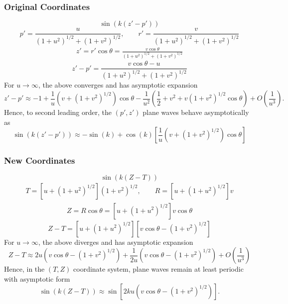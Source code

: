 \documentclass[10pt,letterpaper]{article}
\begin{document}
\subsubsection*{Original Coordinates}
\begin{equation}
\sin(k(z'-p'))
\end{equation}
\begin{equation}
p' = \frac{ u}{(1+u^2)^{1/2}+(1+v^2)^{1/2}},\qquad r' = \frac{v}{(1+u^2)^{1/2}+(1+v^2)^{1/2}}
\end{equation}
\begin{align}
z' = r'\cos\theta = \frac{v\cos\theta}{(1+u^2)^{1/2}+(1+v^2)^{1/2}}
\end{align}
\begin{equation}
z'-p' = \frac{v\cos\theta - u}{(1+u^2)^{1/2}+(1+v^2)^{1/2}}
\end{equation}
For $u \to \infty$, the above converges and has asymptotic expansion
\begin{equation}
z'-p' \approx -1 + \frac{1}{u}(v+(1+v^2)^{1/2})\cos\theta - \frac{1}{u^2}\left( \frac12 + v^2 +v(1+v^2)^{1/2}\cos\theta\right) +  O\left( \frac{1}{u^3}\right).
\end{equation}
Hence, to second leading order, the $(p',z')$ plane waves behave asymptotically as
\begin{equation}
\sin(k(z'-p')) \approx -\sin(k) + \cos(k)\left[ \frac{1}{u}(v+(1+v^2)^{1/2})\cos\theta\right]
\end{equation}
\subsubsection*{New Coordinates}
\begin{equation}
\sin(k(Z-T)) 
\end{equation}
\begin{align}
T = \left[u+(1+u^2)^{1/2}\right]( 1+v^2)^{1/2},\qquad R = \left[u+(1+u^2)^{1/2}\right]v
\end{align}
\begin{align}
Z = R\cos\theta = \left[u+(1+u^2)^{1/2}\right]v\cos\theta
\end{align}
\begin{equation}
Z-T = \left[u+(1+u^2)^{1/2}\right]\left[v\cos\theta - ( 1+v^2)^{1/2}\right]
\end{equation}
For $u \to \infty$, the above diverges and has asymptotic expansion
\begin{equation}
Z-T \approx 2 u \left( v\cos\theta - (1+v^2)^{1/2}\right) + \frac{1}{2u}\left( v\cos\theta - (1+v^2)^{1/2}\right) + O\left( \frac{1}{u^3}\right)
\end{equation}
Hence, in the $(T,Z)$ coordinate system, plane waves remain at least periodic with asymptotic form
\begin{equation}
\sin(k(Z-T)) \approx \sin\left[ 2 k u \left( v\cos\theta - (1+v^2)^{1/2}\right)\right].
\end{equation}
\end{document}
